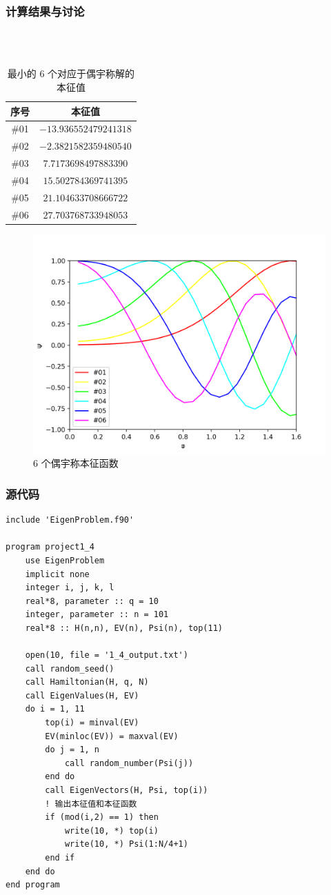 \documentclass{ctexart}
\begin{document}
\subsubsection{计算结果与讨论}
~\\
~\\
\begin{table}[h]
\centering
\caption{最小的 6 个对应于偶宇称解的本征值}
\begin{tabular}{cc}
\toprule
序号 & 本征值\\
\midrule
\#01 & $-13.936552479241318$\\
\#02 & $-2.3821582359480540$\\
\#03 & $7.7173698497883390$\\
\#04 & $15.502784369741395$\\
\#05 & $21.104633708666722$\\
\#06 & $27.703768733948053$\\
\bottomrule
\end{tabular}
\end{table}


\begin{figure}[h]
\centering
\includegraphics[scale=0.7]{even.png}
\caption{6 个偶宇称本征函数}
\end{figure}
\subsubsection{源代码}
\begin{lstlisting}
include 'EigenProblem.f90'

program project1_4
    use EigenProblem
    implicit none
    integer i, j, k, l
    real*8, parameter :: q = 10
    integer, parameter :: n = 101
    real*8 :: H(n,n), EV(n), Psi(n), top(11)

    open(10, file = '1_4_output.txt')
    call random_seed()
    call Hamiltonian(H, q, N)
    call EigenValues(H, EV)
    do i = 1, 11
        top(i) = minval(EV)
        EV(minloc(EV)) = maxval(EV)
        do j = 1, n
            call random_number(Psi(j))
        end do
        call EigenVectors(H, Psi, top(i))
        ! 输出本征值和本征函数
        if (mod(i,2) == 1) then
            write(10, *) top(i)
            write(10, *) Psi(1:N/4+1)
        end if
    end do
end program
\end{lstlisting}
\newpage
\end{document}
